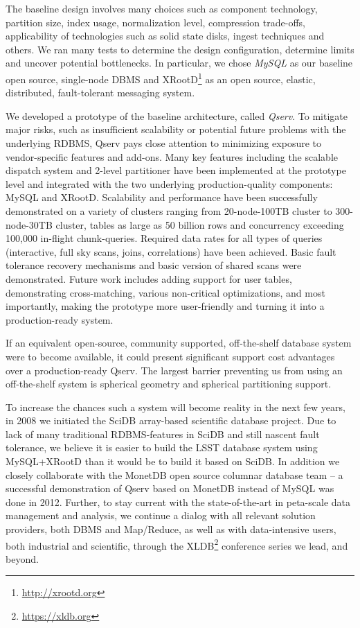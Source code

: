 \documentclass[DM,lsstdraft,toc]{lsstdoc}
\begin{document}
The baseline design involves many choices such as component technology,
partition size, index usage, normalization level, compression
trade-offs, applicability of technologies such as solid state disks,
ingest techniques and others. We ran many tests to determine the design
configuration, determine limits and uncover potential bottlenecks. In
particular, we chose \emph{MySQL} as our baseline open source,
single-node DBMS and XRootD\footnote{\url{http://xrootd.org}} \citep{Dorigo:2005:XRootd}
as an open source, elastic, distributed, fault-tolerant messaging system.

We developed a prototype of the baseline architecture, called
\emph{Qserv}. To mitigate major risks, such as insufficient scalability
or potential future problems with the underlying RDBMS, Qserv pays close
attention to minimizing exposure to vendor-specific features and
add-ons. Many key features including the scalable dispatch system and
2-level partitioner have been implemented at the prototype level and
integrated with the two underlying production-quality components: MySQL
and XRootD. Scalability and performance have
been successfully demonstrated on a variety of clusters ranging from
20-node-100TB cluster to 300-node-30TB cluster, tables as large as 50
billion rows and concurrency exceeding 100,000 in-flight chunk-queries.
Required data rates for all types of queries (interactive, full sky
scans, joins, correlations) have been achieved. Basic fault tolerance
recovery mechanisms and basic version of shared scans were demonstrated.
Future work includes adding support for user tables, demonstrating
cross-matching, various non-critical optimizations, and most
importantly, making the prototype more user-friendly and turning it into
a production-ready system.

If an equivalent open-source, community supported, off-the-shelf
database system were to become available, it could present significant
support cost advantages over a production-ready Qserv. The largest
barrier preventing us from using an off-the-shelf system is spherical
geometry and spherical partitioning support.

To increase the chances such a system will become reality in the next
few years, in 2008 we initiated the SciDB array-based scientific
database project. Due to lack of many traditional RDBMS-features in
SciDB and still nascent fault tolerance, we believe it is easier to
build the LSST database system using
MySQL+XRootD than it would be to build it
based on SciDB. In addition we closely collaborate with the MonetDB open
source columnar database team -- a successful demonstration of Qserv
based on MonetDB instead of MySQL was done in 2012. Further, to stay
current with the state-of-the-art in peta-scale data management and
analysis, we continue a dialog with all relevant solution providers,
both DBMS and Map/Reduce, as well as with data-intensive users, both
industrial and scientific, through the XLDB\footnote{\url{https://xldb.org}}
conference series we lead, and beyond.
\end{document}
